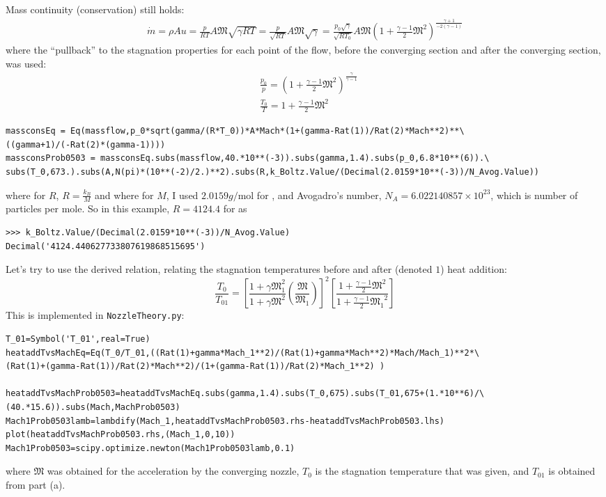 \documentclass[10pt]{amsart}
\begin{document}
\begin{multicols*}{2}
\begin{enumerate}
Mass continuity (conservation) still holds:
\[
\begin{gathered}
  \dot{m} = \rho A u = \frac{p}{RT} A \mathfrak{M} \sqrt{ \gamma RT } = \frac{p}{\sqrt{RT}} A\mathfrak{M} \sqrt{\gamma } = \frac{p_0 \sqrt{\gamma }}{ \sqrt{RT_0 } } A \mathfrak{M} (1 + \frac{\gamma -1}{2} \mathfrak{M}^2 )^{ \frac{\gamma+1}{-2(\gamma -1) } }
\end{gathered}
\]
where the ``pullback'' to the stagnation properties for each point of the flow, before the converging section and after the converging section, was used:
\[
\begin{aligned}
  & \frac{p_0}{p} = \left( 1 + \frac{\gamma-1}{2} \mathfrak{M}^2 \right)^{\frac{\gamma}{\gamma -1} } \\
  &  \frac{T_0}{T} = 1 + \frac{\gamma-1}{2} \mathfrak{M}^2
\end{aligned}
\]
\begin{lstlisting}
massconsEq = Eq(massflow,p_0*sqrt(gamma/(R*T_0))*A*Mach*(1+(gamma-Rat(1))/Rat(2)*Mach**2)**\
((gamma+1)/(-Rat(2)*(gamma-1))))
massconsProb0503 = massconsEq.subs(massflow,40.*10**(-3)).subs(gamma,1.4).subs(p_0,6.8*10**(6)).\
subs(T_0,673.).subs(A,N(pi)*(10**(-2)/2.)**2).subs(R,k_Boltz.Value/(Decimal(2.0159*10**(-3))/N_Avog.Value))
\end{lstlisting}
where for $R$, $R = \frac{k_B}{M}$ and where for $M$, I used $2.0159 g/\text{mol}$ for , and Avogadro's number, $N_A = 6.022140857\times 10^{23}$, which is number of particles per mole.  So in this example, $R = 4124.4$ for \ce{H2} as
\begin{lstlisting}
>>> k_Boltz.Value/(Decimal(2.0159*10**(-3))/N_Avog.Value)
Decimal('4124.440627733807619868515695')
\end{lstlisting}

Let's try to use the derived relation, relating the stagnation temperatures before and after (denoted $1$) heat addition:
\[
\frac{T_0}{T_{01}} = \left[ \frac{ 1 + \gamma \mathfrak{M}_1^2 }{1 + \gamma \mathfrak{M}^2}\left( \frac{\mathfrak{M}}{\mathfrak{M}_1}\right)\right]^2\left[\frac{1+\frac{\gamma-1}{2}\mathfrak{M}^2}{1+\frac{\gamma-1}{2}\mathfrak{M_1}^2}\right]
\]
This is implemented in \verb|NozzleTheory.py|:
\begin{lstlisting}
T_01=Symbol('T_01',real=True)
heataddTvsMachEq=Eq(T_0/T_01,((Rat(1)+gamma*Mach_1**2)/(Rat(1)+gamma*Mach**2)*Mach/Mach_1)**2*\
(Rat(1)+(gamma-Rat(1))/Rat(2)*Mach**2)/(1+(gamma-Rat(1))/Rat(2)*Mach_1**2) )

heataddTvsMachProb0503=heataddTvsMachEq.subs(gamma,1.4).subs(T_0,675).subs(T_01,675+(1.*10**6)/\
(40.*15.6)).subs(Mach,MachProb0503)
Mach1Prob0503lamb=lambdify(Mach_1,heataddTvsMachProb0503.rhs-heataddTvsMachProb0503.lhs)
plot(heataddTvsMachProb0503.rhs,(Mach_1,0,10))
Mach1Prob0503=scipy.optimize.newton(Mach1Prob0503lamb,0.1)
\end{lstlisting}
where $\mathfrak{M}$ was obtained for the acceleration by the converging nozzle, $T_0$ is the stagnation temperature that was given, and $T_{01}$ is obtained from part (a).  


\end{enumerate}
\end{multicols*}
\end{document}
